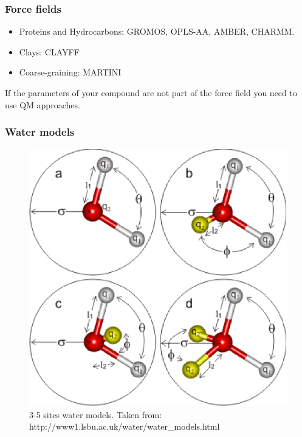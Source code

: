 \documentclass{beamer}
\begin{document}
\begin{frame}\frametitle{Force fields}

\begin{itemize}
\item Proteins and Hydrocarbons: GROMOS, OPLS-AA, AMBER, CHARMM.
\item Clays: CLAYFF
\item Coarse-graining: MARTINI
\end{itemize}

If the parameters of your compound are not part of the force field you need to use QM approaches.

\end{frame}

\begin{frame}\frametitle{Water models}

\begin{figure}
\includegraphics[scale=0.34]{h2o_models.eps}
\caption{{\scriptsize 3-5 sites water models. Taken from: http://www1.lsbu.ac.uk/water/water\_models.html}}
\end{figure}

\end{frame}
\end{document}
